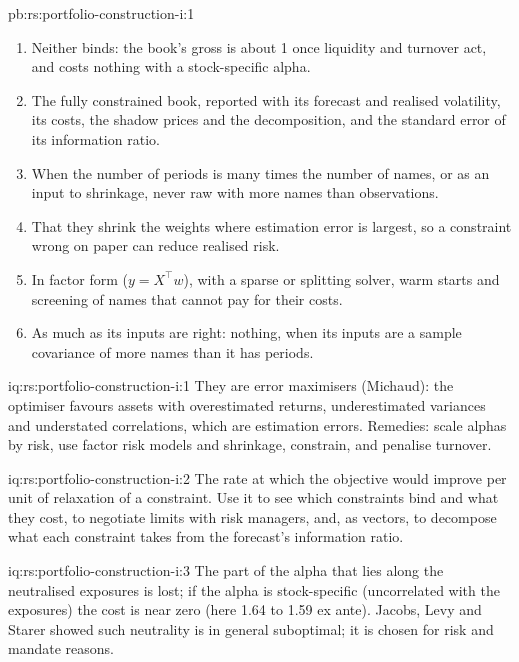 \begin{solution}{pb:rs:portfolio-construction-i:1}
\begin{enumerate}
\item Neither binds: the book's gross is about 1 once liquidity and turnover act, and  costs nothing with a stock-specific alpha.
\item The fully constrained book, reported with its forecast and realised volatility, its costs, the shadow prices and the decomposition, and the standard error of
its information ratio.
\item When the number of periods is many times the number of names, or as an input to shrinkage, never raw with more names than observations.
\item That they shrink the weights where estimation error is largest, so a constraint wrong on paper can reduce realised risk.
\item In factor form ($y = X^\top w$), with a sparse or splitting solver, warm starts and screening of names that cannot pay for their costs.
\item As much as its inputs are right: nothing, when its inputs are a sample covariance of more names than it has periods.
\end{enumerate}
\end{solution}

\begin{solution}{iq:rs:portfolio-construction-i:1}
They are error maximisers (Michaud): the optimiser favours assets with overestimated returns, underestimated variances and understated correlations, which are
estimation errors. Remedies: scale alphas by risk, use factor risk models and shrinkage, constrain, and penalise turnover.
\end{solution}

\begin{solution}{iq:rs:portfolio-construction-i:2}
The rate at which the objective would improve per unit of relaxation of a constraint. Use it to see which constraints bind and what they cost, to negotiate limits
with risk managers, and, as vectors, to decompose what each constraint takes from the forecast's information ratio.
\end{solution}

\begin{solution}{iq:rs:portfolio-construction-i:3}
The part of the alpha that lies along the neutralised exposures is lost; if the alpha is stock-specific (uncorrelated with the exposures) the cost is near zero
(here 1.64 to 1.59 ex ante). Jacobs, Levy and Starer showed such neutrality is in general suboptimal; it is chosen for risk and mandate reasons.
\end{solution}

